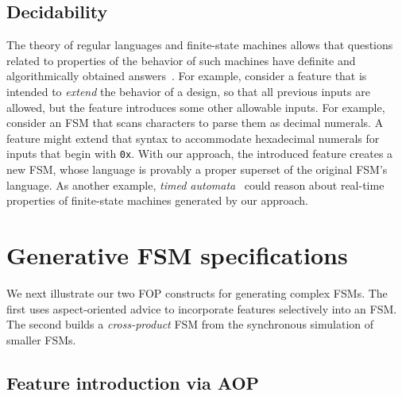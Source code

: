 \documentclass[sigplan,anonymous, review]{acmart}
\begin{document}
  
\subsection{Decidability}\label{sec:decide}

The theory of regular languages and finite-state machines allows that questions related to properties of the behavior of such machines have definite and algorithmically obtained answers~\cite{sipser}. For example, consider a feature that is intended to \emph{extend} the behavior of a design, so that all previous inputs are allowed, but the feature introduces some other allowable inputs. For example, consider an FSM that scans characters to parse them as decimal numerals.  A feature might extend that syntax to accommodate hexadecimal numerals for inputs that begin with \texttt{0x}.  With our approach, the introduced feature creates a new FSM, whose language is provably a proper superset of the original FSM's language.  As another example, \emph{timed automata}~\cite{10.1145/2518102} could reason about real-time properties of finite-state machines generated by our approach.   

\section{Generative FSM specifications}

We next illustrate our two FOP constructs for generating complex FSMs.  The first uses aspect-oriented advice to incorporate features selectively into an FSM.  The second builds a \emph{cross-product} FSM from the synchronous simulation of smaller FSMs.

\subsection{Feature introduction via AOP}\label{sec:vend}
\end{document}
